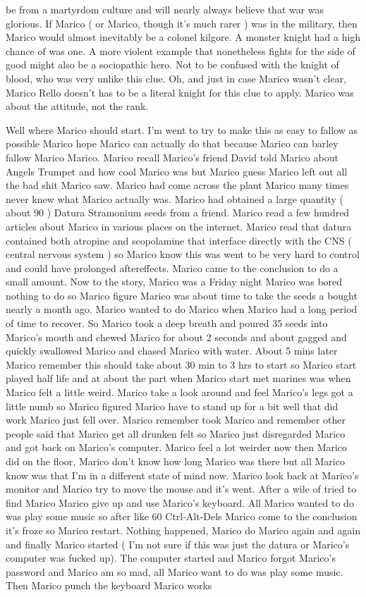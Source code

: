 \documentclass[12pt]{book}
\begin{document}
be from a martyrdom culture and will nearly always believe that war was glorious. If Marico ( or Marico, though it's much rarer ) was in the military, then Marico would almost inevitably be a colonel kilgore. A monster knight had a high chance of was one. A more violent example that nonetheless fights for the side of good might also be a sociopathic hero. Not to be confused with the knight of blood, who was very unlike this clue. Oh, and just in case Marico wasn't clear, Marico Rello doesn't has to be a literal knight for this clue to apply. Marico was about the attitude, not the rank.



Well where Marico should start. I'm went to try to make this as easy to fallow as possible Marico hope Marico can actually do that because Marico can barley fallow Marico Marico. Marico recall Marico's friend David told Marico about Angels Trumpet and how cool Marico was but Marico guess Marico left out all the bad shit Marico saw. Marico had come across the plant Marico many times never knew what Marico actually was. Marico had obtained a large quantity ( about 90 ) Datura Stramonium seeds from a friend. Marico read a few hundred articles about Marico in various places on the internet. Marico read that datura contained both atropine and scopolamine that interface directly with the CNS ( central nervous system ) so Marico know this was went to be very hard to control and could have prolonged aftereffects. Marico came to the conclusion to do a small amount. Now to the story, Marico was a Friday night Marico was bored nothing to do so Marico figure Marico was about time to take the seeds a bought nearly a month ago. Marico wanted to do Marico when Marico had a long period of time to recover. So Marico took a deep breath and poured 35 seeds into Marico's mouth and chewed Marico for about 2 seconds and about gagged and quickly swallowed Marico and chased Marico with water. About 5 mins later Marico remember this should take about 30 min to 3 hrs to start so Marico start played half life and at about the part when Marico start met marines was when Marico felt a little weird. Marico take a look around and feel Marico's legs got a little numb so Marico figured Marico have to stand up for a bit well that did work Marico just fell over. Marico remember took Marico and remember other people said that Marico get all drunken felt so Marico just disregarded Marico and got back on Marico's computer. Marico feel a lot weirder now then Marico did on the floor, Marico don't know how long Marico was there but all Marico know was that I'm in a different state of mind now. Marico look back at Marico's monitor and Marico try to move the mouse and it's went. After a wile of tried to find Marico Marico give up and use Marico's keyboard. All Marico wanted to do was play some music so after like 60 Ctrl-Alt-Dels Marico come to the conclusion it's froze so Marico restart. Nothing happened, Marico do Marico again and again and finally Marico started ( I'm not sure if this was just the datura or Marico's computer was fucked up). The computer started and Marico forgot Marico's password and Marico am so mad, all Marico want to do was play some music. Then Marico punch the keyboard Marico works 
\end{document}
